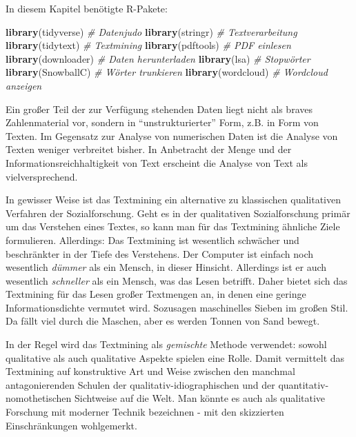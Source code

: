 \documentclass[12pt,ngerman,]{book}
\makeatletter
\newenvironment{Shaded}{\begin{snugshade}}{\end{snugshade}}
\newcommand{\KeywordTok}[1]{\textcolor[rgb]{0.13,0.29,0.53}{\textbf{{#1}}}}
\newcommand{\CommentTok}[1]{\textcolor[rgb]{0.56,0.35,0.01}{\textit{{#1}}}}
\newcommand{\NormalTok}[1]{{#1}}
\newenvironment{kframe}{%
\medskip{}
\setlength{\fboxsep}{.8em}
 \def\at@end@of@kframe{}%
 \ifinner\ifhmode%
  \def\at@end@of@kframe{\end{minipage}}%
  \begin{minipage}{\columnwidth}%
 \fi\fi%
 \def\FrameCommand##1{\hskip\@totalleftmargin \hskip-\fboxsep
 \colorbox{shadecolor}{##1}\hskip-\fboxsep
     \hskip-\linewidth \hskip-\@totalleftmargin \hskip\columnwidth}%
 \MakeFramed {\advance\hsize-\width
   \@totalleftmargin\z@ \linewidth\hsize
   \@setminipage}}%
 {\par\unskip\endMakeFramed%
 \at@end@of@kframe}
\renewenvironment{Shaded}{\begin{kframe}}{\end{kframe}}
\makeatother
\begin{document}
In diesem Kapitel benötigte R-Pakete:

\begin{Shaded}
\begin{Highlighting}[]
\KeywordTok{library}\NormalTok{(tidyverse)  }\CommentTok{# Datenjudo}
\KeywordTok{library}\NormalTok{(stringr)  }\CommentTok{# Textverarbeitung}
\KeywordTok{library}\NormalTok{(tidytext)  }\CommentTok{# Textmining}
\KeywordTok{library}\NormalTok{(pdftools)  }\CommentTok{# PDF einlesen}
\KeywordTok{library}\NormalTok{(downloader)  }\CommentTok{# Daten herunterladen}
\KeywordTok{library}\NormalTok{(lsa)  }\CommentTok{# Stopwörter }
\KeywordTok{library}\NormalTok{(SnowballC)  }\CommentTok{# Wörter trunkieren}
\KeywordTok{library}\NormalTok{(wordcloud)  }\CommentTok{# Wordcloud anzeigen}
\end{Highlighting}
\end{Shaded}

Ein großer Teil der zur Verfügung stehenden Daten liegt nicht als braves
Zahlenmaterial vor, sondern in ``unstrukturierter'' Form, z.B. in Form
von Texten. Im Gegensatz zur Analyse von numerischen Daten ist die
Analyse von Texten weniger verbreitet bisher. In Anbetracht der Menge
und der Informationsreichhaltigkeit von Text erscheint die Analyse von
Text als vielversprechend.

In gewisser Weise ist das Textmining ein alternative zu klassischen
qualitativen Verfahren der Sozialforschung. Geht es in der qualitativen
Sozialforschung primär um das Verstehen eines Textes, so kann man für
das Textmining ähnliche Ziele formulieren. Allerdings: Das Textmining
ist wesentlich schwächer und beschränkter in der Tiefe des Verstehens.
Der Computer ist einfach noch wesentlich \emph{dümmer} als ein Mensch,
in dieser Hinsicht. Allerdings ist er auch wesentlich \emph{schneller}
als ein Mensch, was das Lesen betrifft. Daher bietet sich das Textmining
für das Lesen großer Textmengen an, in denen eine geringe
Informationsdichte vermutet wird. Sozusagen maschinelles Sieben im
großen Stil. Da fällt viel durch die Maschen, aber es werden Tonnen von
Sand bewegt.

In der Regel wird das Textmining als \emph{gemischte} Methode verwendet:
sowohl qualitative als auch qualitative Aspekte spielen eine Rolle.
Damit vermittelt das Textmining auf konstruktive Art und Weise zwischen
den manchmal antagonierenden Schulen der qualitativ-idiographischen und
der quantitativ-nomothetischen Sichtweise auf die Welt. Man könnte es
auch als qualitative Forschung mit moderner Technik bezeichnen - mit den
skizzierten Einschränkungen wohlgemerkt.
\end{document}
